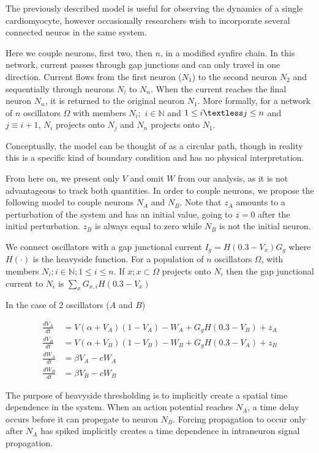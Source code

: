 \documentclass[11pt]{report}
\begin{document}
The previously described model is useful for observing the dynamics of a single cardiomyocyte, however occasionally researchers wish to incorporate several connected neuros in the same system. 

Here we couple neurons, first two, then $n$, in a modified synfire chain. In this network, current passes through gap junctions and can only travel in one direction. Current flows from the first neuron ($N_1$) to the second neuron $N_2$ and sequentially through neurons $N_i$ to $N_n$. When the current reaches the final neuron $N_n$, it is returned to the original neuron $N_1$. More formally, for a network of $n$ oscillators $\Omega$ with members $N_i; \, \, i \in \mathbb{N}$ and $1 \leq i \textless j \leq n$ and $j \equiv i+1$, $N_i$ projects onto $N_j$ and $N_n$ projects onto $N_1$. 


Conceptually, the model can be thought of as a circular path, though in reality this is a specific kind of boundary condition and has no physical interpretation.

From here on, we present only $V$ and omit $W$ from our analysis, as it is not advantageous to track both quantities. In order to couple neurons, we propose the following model to couple neurons $N_A$ and $N_B$. Note that $z_A$ amounts to a perturbation of the system and has an initial value, going to $z=0$ after the initial perturbation. $z_B$ is always equal to zero while $N_B$ is not the initial neuron.


We connect oscillators with a gap junctional current $I_g = H( 0.3 - V_x ) G_g$ where $H(\cdot)$ is the heavyside function. For a population of $n$ oscillators $\Omega$, with members $N_i; i\in \mathbb{N}; 1\leq i\leq n$. If $x; x\subset\Omega$ projects onto $N_i$ then the gap junctional current to $N_i$ is $\sum_{x} G_{x,i}H( 0.3 - V_x )$

In the case of 2 oscillators ($A$ and $B$)

$$ \begin{aligned} \frac{dV_A}{dt} &= V(\alpha +V_A)(1-V_A) -W_A + G_g H( 0.3 - V_B ) + z_A\\ \frac{dV_B}{dt} &= V(\alpha +V_B)(1-V_B) -W_B + G_g H( 0.3 - V_A ) +z_B\\ \frac{dW_A}{dt} &= \beta V_A - cW_A\\ \frac{dW_B}{dt} &= \beta V_B - cW_B
\end{aligned} $$

The purpose of heavyside thresholding is to implicitly create a spatial time dependence in the system. When an action potential reaches $N_A$, a time delay occurs before it can propegate to neuron $N_B$. Forcing propagation to occur only after $N_A$ has spiked implicitly creates a time dependence in intraneuron signal propagation.
\end{document}

